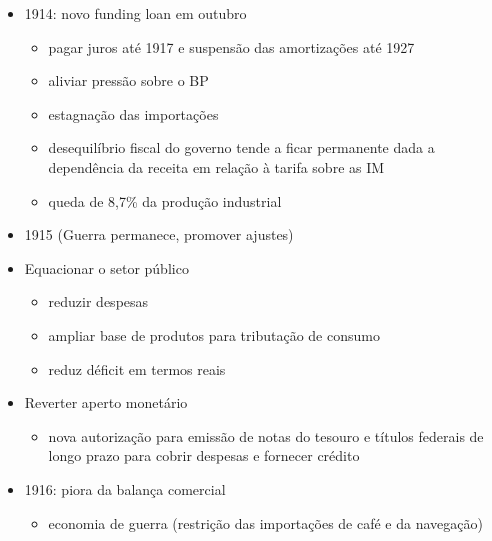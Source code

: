 \documentclass[a4paper,12pt]{article}[abntex2]
\begin{document}
\begin{itemize}
    \item 1914: novo funding loan em outubro
    \begin{itemize}
        \item pagar juros até 1917 e suspensão das amortizações até 1927
    \end{itemize}
    \begin{itemize}
        \item aliviar pressão sobre o BP
    \end{itemize}
    \begin{itemize}
        \item  estagnação das importações
    \end{itemize}
    \begin{itemize}
        \item desequilíbrio fiscal do governo tende a ficar permanente dada a dependência da receita em relação à tarifa sobre as IM
    \end{itemize}
    \begin{itemize}
        \item  queda de 8,7\% da produção industrial
    \end{itemize}
\item 1915 (Guerra permanece, promover ajustes)
\item  Equacionar o setor público
\begin{itemize}
    \item reduzir despesas
\end{itemize}
\begin{itemize}
    \item ampliar base de produtos para tributação de consumo
\end{itemize}
\begin{itemize}
    \item reduz déficit em termos reais
\end{itemize}
\item  Reverter aperto monetário
\begin{itemize}
    \item nova autorização para emissão de notas do tesouro e títulos federais de longo prazo para cobrir despesas e fornecer crédito
\end{itemize}
\item 1916: piora da balança comercial
\begin{itemize}
    \item economia de guerra (restrição das importações de café e da navegação)

\end{itemize}
\end{itemize}
\end{document}
